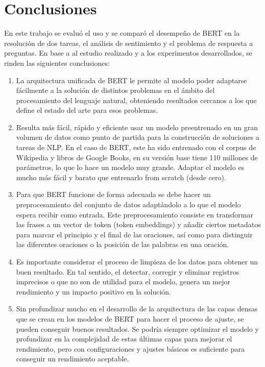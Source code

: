 
\chapter{Conclusiones}
\label{chapter-conclusiones}

En este trabajo se evaluó el uso y se comparó el desempeño de BERT en la resolución de dos tareas, el análisis de sentimiento y el problema de respuesta a preguntas. En base a al estudio realizado y a los experimentos desarrollados, se rinden las siguientes conclusiones:

\begin{enumerate}[label=\destacado{\arabic*.}]
  \setlength\itemsep{1em}

  \item La arquitectura unificada de BERT le permite al modelo poder adaptarse fácilmente a la solución de distintos problemas en el ámbito del procesamiento del lenguaje natural, obteniendo resultados cercanos a los que define el estado del arte para esos problemas. 

  \item Resulta más fácil, rápido  y eficiente usar un modelo preentrenado en un gran volumen de datos como punto de partida para la construcción de soluciones a tareas de NLP. En el caso de BERT, este ha sido entrenado con el corpus de Wikipedia y libros de Google Books, en su versión base tiene 110 millones de parámetros, lo que lo hace un modelo muy grande. Adaptar el modelo es mucho más fácil y barato que entrenarlo from scratch (desde cero).

  \item Para que BERT funcione de forma adecuada se debe hacer un preprocesamiento del conjunto de datos adaptándolo a lo que el modelo espera recibir como entrada. Este preprocesamiento consiste en transformar las frases a un vector de token (token embeddings) y añadir ciertos metadatos para marcar el principio y el final de las oraciones, así como para distinguir las diferentes oraciones o la posición de las palabras en una oración.

  \item Es importante considerar el proceso de limpieza de los datos para obtener un buen resultado. En tal sentido, el detectar, corregir y eliminar registros imprecisos o que no son de utilidad para el modelo, genera un mejor rendimiento y un impacto positivo en la solución.
  
  \item Sin profundizar mucho en el desarrollo de la arquitectura de las capas densas que se crean en los modelos de BERT para hacer el proceso de ajuste, se pueden conseguir buenos resultados. Se podría siempre optimizar el modelo y profundizar en la complejidad de estas últimas capas para mejorar el rendimiento, pero con configuraciones y ajustes básicos es suficiente para conseguir un rendimiento aceptable.
  

\end{enumerate}
